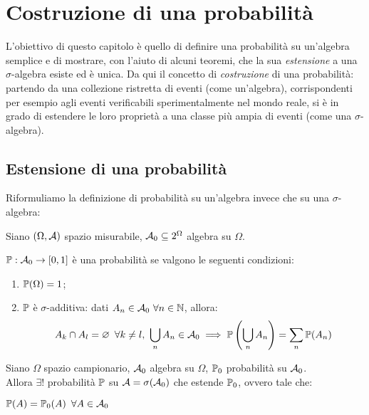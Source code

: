 
\section{Costruzione di una probabilità}
L'obiettivo di questo capitolo è quello di definire una probabilità su un'algebra semplice e di mostrare, con l'aiuto di alcuni  teoremi, che la sua \emph{estensione} a una $\sigma$-algebra esiste ed è unica.
Da qui il concetto di \emph{costruzione} di una probabilità:
partendo da una collezione ristretta di eventi (come un'algebra), corrispondenti per esempio agli eventi verificabili sperimentalmente nel mondo reale, si è in grado di estendere le loro proprietà a una classe più ampia di eventi (come una $\sigma$-algebra).

\subsection{Estensione di una probabilità}

\medskip
Riformuliamo la definizione di probabilità su un'algebra invece che su una $\sigma$-algebra:\\[-8pt]
\begin{defn}
  Siano $(\Omega, \mathcal A)$ spazio misurabile,
  $\mathcal A_0 \subseteq 2^\Omega$ algebra su $\Omega$.

  $\mathbb P:\mathcal A_0 \to [0,1]$ è una probabilità se valgono le seguenti condizioni:
  \begin{enumerate}
    \item $\mathbb P(\Omega) = 1$;
    \item $\mathbb P$ è $\sigma$-additiva: dati $A_n \in \mathcal A_0 \ \forall n \in \mathbb N$, allora:
      $$A_k \cap A_l  = \varnothing \enspace \forall k \neq l, \ \bigcup\limits_{n} A_n \in \mathcal A_0  \implies \mathbb P\left(\bigcup\limits_{n} A_n \right) = \sum\limits_{n} \mathbb P(A_n)$$
  \end{enumerate}
\end{defn}

\begin{teob}[\JPTh{6.1}]
  \label{teo-dalla-dimostrazione-ignota}
  Siano $\Omega$ spazio campionario, $\mathcal A_0$ algebra su $\Omega$, $\mathbb P_0$ probabilità su $\mathcal A_0$. \\
  Allora $\exists!$ probabilità $\mathbb P$ su $\mathcal A = \sigma(\mathcal A_0)$ che estende $\mathbb P_0$, ovvero tale che:
  \begin{center}
  	$\mathbb P(A) = \mathbb P_0(A) \enspace \forall A \in \mathcal A_0$
  \end{center}
\end{teob}

